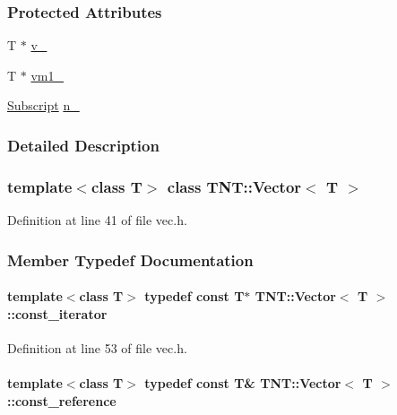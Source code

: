 \subsubsection*{Protected Attributes}
\begin{DoxyCompactItemize}
\item 
T $\ast$ \hyperlink{class_t_n_t_1_1_vector_a67b413bf6956350ff9dda9faee707433}{v\_\-}
\item 
T $\ast$ \hyperlink{class_t_n_t_1_1_vector_a55f5ebf43f5af53aabdfae15a1ce11d4}{vm1\_\-}
\item 
\hyperlink{namespace_t_n_t_af22e3f1460e145c04ce4e7d701e4c1c1}{Subscript} \hyperlink{class_t_n_t_1_1_vector_accfd20cf0105ad3c153aeebf728f5bbc}{n\_\-}
\end{DoxyCompactItemize}


\subsubsection{Detailed Description}
\subsubsection*{template$<$class T$>$ class TNT::Vector$<$ T $>$}



Definition at line 41 of file vec.h.



\subsubsection{Member Typedef Documentation}
\paragraph[{const\_\-iterator}]{\setlength{\rightskip}{0pt plus 5cm}template$<$class T$>$ typedef const T$\ast$ {\bf TNT::Vector}$<$ T $>$::{\bf const\_\-iterator}}\hfill\label{class_t_n_t_1_1_vector_a9a825ae9b3cb568a7b02449da6e9779f}


Definition at line 53 of file vec.h.

\paragraph[{const\_\-reference}]{\setlength{\rightskip}{0pt plus 5cm}template$<$class T$>$ typedef const T\& {\bf TNT::Vector}$<$ T $>$::{\bf const\_\-reference}}\hfill\label{class_t_n_t_1_1_vector_a2957faed9560f1f53bc5943a160d71bf}


